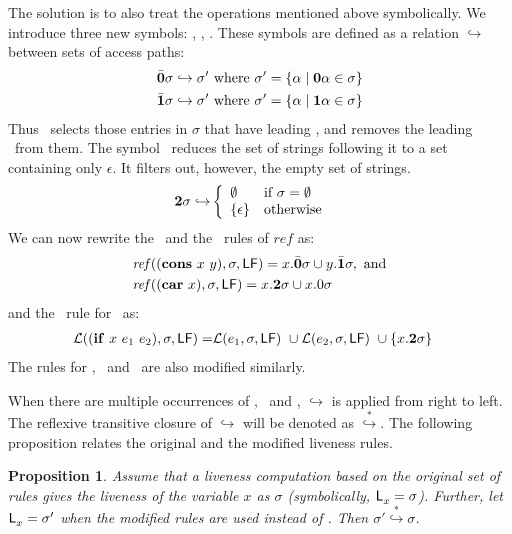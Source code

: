 \documentclass[9pt]{sigplanconf}
\newtheorem{proposition}[theorem]{Proposition}
\begin{document}
The solution is to  also treat the operations mentioned
above  symbolically.  We  introduce three  new symbols:
\bcar, \bcdr,  \clazy.  These symbols are  defined as a
relation  $\hookrightarrow$  between   sets  of  access
paths:
\begin{align*}
  &\bar{\mathbf{0}}\sigma \hookrightarrow \sigma' \mbox{ where } \sigma' = \{\alpha \mid \mathbf{0}\alpha \in \sigma\}\\
  &\bar{\mathbf{1}}\sigma \hookrightarrow \sigma' \mbox{ where } \sigma' = \{\alpha \mid \mathbf{1}\alpha \in \sigma\}
\end{align*}
Thus \bcar\ selects those entries in $\sigma$ that have leading \acar, and removes the leading \acar\ from them.
The symbol \clazy\ reduces the set of strings following it to a set containing only $\epsilon$. It filters out, however, the empty set of strings.
\begin{align*}
  {\mathbf{2}}\sigma \hookrightarrow & \left\{ 
  \begin{array}{ll}
    \emptyset&\mbox{if}~\sigma = \emptyset\\
    \{\epsilon\} & \mbox{otherwise}
  \end{array}\right.
\end{align*}
We can  now rewrite the \CONS\  and the \CAR\  rules of $\mathit{ref}$
as:
\begin{align*}
&\mathit{ref\/}((\mbox{$\mathbf{cons}$}~x~y),\sigma,\mathsf{LF})
= x.\bar{\mathbf{0}}\sigma \cup y.\bar{\mathbf{1}}\sigma  \label{eqn:mod-cons},~
\mbox{and} \\
&\mathit{ref\/}((\mbox{$\mathbf{car}$}~x),\sigma,\mathsf{LF})
          =   x.{\mathbf{2}}\sigma \cup x.0\sigma
\end{align*}
and the \Lfunonly\ rule
for \SIF\ as:
\begin{align*}
\mathcal{L}((\mbox{$\mathbf{ if}$}~x~e_1~e_2),\sigma,\mathsf{LF}) =
                    &\mathcal{L}(e_1,\sigma,\mathsf{LF})~\cup
        \mathcal{L}(e_2,\sigma,\mathsf{LF})~\cup
          \{x.{\mathbf{2}} \sigma\}
\end{align*}
The rules for  \CDR, \PRIM\ and \NULLQ\ are also
modified similarly.


When   there  are   multiple   occurrences  of   \bcar,
\bcdr\  and \clazy,  $\hookrightarrow$ is  applied from
right  to left.   The reflexive  transitive closure  of
$\hookrightarrow$      will      be     denoted      as
$\stackrel{*}{\hookrightarrow}$.      The     following
proposition  relates  the  original  and  the  modified
liveness rules. 
\begin{proposition}
Assume  that  a  liveness   computation  based  on  the
original  set  of  rules  gives  the  liveness  of  the
variable  $x$   as $\sigma$
(symbolically,  $\mathsf{L}_{{x}}^{}=  \sigma$).  Further,  let
$\mathsf{L}_{{x}}^{}= \sigma'$ when the modified rules are used
instead      of      \Lfunonly.      Then      $\sigma'
\stackrel{*}{\hookrightarrow} \sigma$.
\end{proposition}
\end{document}
